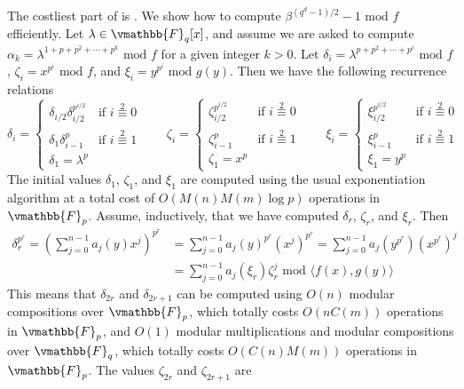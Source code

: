 The costliest part of  is . We show how to 
compute $\beta^{(q^d - 1) / 2} - 1 \text{ mod } f$ efficiently. Let $\lambda \in \vmathbb{F}_q[x]$, 
and assume we are asked to compute $\alpha_k = \lambda^{1 + p + p^2 + \cdots + p^k} \text{ mod } f$ 
for a given integer $k > 0$. Let $\delta_i = \lambda^{p + p^2 + \cdots + p^i} \text{ mod } f$, 
$\zeta_i = x^{p^i} \text{ mod } f$, and $\xi_i = y^{p^i}  \text{ mod } g(y)$. Then we have the 
following recurrence relations
$$
\delta_i = 
\begin{cases}
\delta_{i / 2}\delta_{i / 2}^{p^{i / 2}} & \text{if } i \overset{2}{\equiv} 0 \\
\delta_1\delta_{i - 1}^p & \text{if } i \overset{2}{\equiv} 1 \\
\delta_1 = \lambda^p
\end{cases}
\qquad
\zeta_i = 
\begin{cases}
\zeta_{i / 2}^{p^{i / 2}} & \text{if } i \overset{2}{\equiv} 0 \\
\zeta_{i - 1}^p & \text{if } i \overset{2}{\equiv} 1 \\
\zeta_1 = x^p
\end{cases}
\qquad
\xi_i =
\begin{cases}
\xi_{i / 2}^{p^{i / 2}} & \text{if } i \overset{2}{\equiv} 0 \\
\xi_{i - 1}^p & \text{if } i \overset{2}{\equiv} 1 \\
\xi_1 = y^p
\end{cases}
$$
The initial values $\delta_1$, $\zeta_1$, and $\xi_1$ are computed using the usual exponentiation 
algorithm at a total cost of $O(M(n)M(m)\log p)$ operations in $\vmathbb{F}_p$. Assume, inductively, 
that we have computed $\delta_r$, $\zeta_r$, and $\xi_r$. Then 
\begin{align*}
\delta_r^{p^r} = \left( \sum_{j = 0}^{n - 1} a_j(y)x^j \right)^{p^r} 
& = \sum_{j = 0}^{n - 1} a_j(y)^{p^r}(x^j)^{p^r} = \sum_{j = 0}^{n - 1} a_j(y^{p^r})(x^{p^r})^j\\
& = \sum_{j = 0}^{n - 1} a_j(\xi_r)\zeta_r^j \text{ mod } \langle f(x), g(y) \rangle
\end{align*}
This means that $\delta_{2r}$ and $\delta_{2r + 1}$ can be computed using $O(n)$ modular 
compositions over $\vmathbb{F}_p$, which totally costs $O(nC(m))$ operations in $\vmathbb{F}_p$, and 
$O(1)$ modular multiplications and modular compositions over $\vmathbb{F}_q$, which totally costs 
$O(C(n)M(m))$ operations in $\vmathbb{F}_p$. The values $\zeta_{2r}$ and $\zeta_{2r + 1}$ are 
